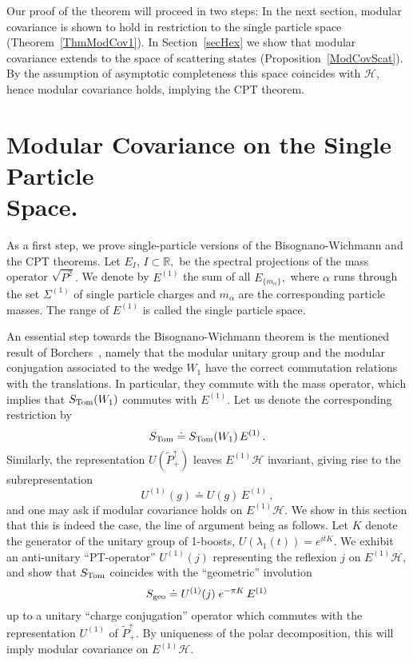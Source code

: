 \documentclass[a4paper,reqno,11pt]{amsart}
\theoremstyle{plain}
\theoremstyle{definition}
\numberwithin{equation}{section}
\newcommand{\Bb}{\mathbb{R}}
\newcommand{\calH}{{\mathcal H}}
\newcommand{\Potild}{\tilde{P}_+^{\uparrow}}
\newcommand{\He}{\calH^{(1)}}
\newcommand{\Sec}{\Sigma} %
\renewcommand{\sec}{\alpha}
\newcommand{\Sece}{\Sec^{(1)}} %
\newcommand{\Stom}{S_{\rm Tom}(W_1)}
\newcommand{\Stome}{S_{\rm Tom}} %
\newcommand{\Sgeoe}{S_{\rm geo}}  %
\newcommand{\msec}{{m_{\sec}}}
\newcommand{\Ue}{U^{(1)}}
\newcommand{\Uej}{U^{(1)}(j)}
\newcommand{\Ee}{E^{(1)}}
\newcommand{\Emsec}{E_{\{\msec\}}}
\begin{document}
Our proof of the theorem will proceed in two steps: In the next 
section, modular covariance is shown to hold in restriction to the
single particle space (Theorem~\ref{ThmModCov1}). 
In Section~\ref{secHex} we show that modular covariance extends to 
the space of scattering states (Proposition~\ref{ModCovScat}). 
By the assumption of asymptotic
completeness this space coincides with $\calH,$ hence modular covariance
holds, implying the CPT theorem. 
\section{Modular Covariance on the Single Particle \\ Space.}  \label{secH1} 
As a first step, we prove single-particle versions of the 
Bisognano-Wichmann and the CPT theorems.  Let $E_I$, $I\subset\Bb,$ be
the spectral projections of the mass 
operator $\sqrt{P^2}.$ We denote by $\Ee$ the sum of all $\Emsec,$ where 
$\sec$ runs through the set $\Sece$ of single particle charges   and 
$m_\sec$ are the corresponding particle masses. The range of $\Ee$ is
called the  single particle space. %

An essential step towards the Bisognano-Wichmann theorem is the 
mentioned result of
Borchers~\cite{Borch92,Borch93}, namely that the modular unitary group  
and the modular conjugation 
associated to the wedge $W_1$ have the correct commutation relations
with the translations. In particular, they commute with the mass
operator, which implies that $\Stom$ commutes with $\Ee.$ Let us denote the 
corresponding restriction by 
\begin{equation*} %
 \Stome\doteq \Stom\,\Ee \,. 
\end{equation*} 
Similarly, the representation $U(\Potild)$  leaves $\Ee\calH$ invariant,
giving rise to the subrepresentation 
\begin{equation*} %
  \Ue(g)\doteq U(g)\,\Ee\,, %
\end{equation*}    %
and one may ask if modular covariance holds on $\Ee\calH.$ We
show in this section that this is indeed the case, the line of
argument being as follows. Let $K$ denote the generator of the unitary
group of 1-boosts, $U(\lambda_1(t))=e^{itK}.$ We exhibit an anti-unitary 
``PT-operator'' $\Uej$ representing the reflexion $j$ on $\Ee\calH,$ and 
show that  $\Stome$ coincides with the ``geometric'' involution 
\begin{equation} \label{eqSgeo}
\Sgeoe\doteq \Uej\;e^{-\pi K}\,\Ee\, 
\end{equation} 
up to a unitary ``charge conjugation'' operator which commutes
with the representation $\Ue$ of $\Potild.$ 
By uniqueness of the polar decomposition, this will imply modular
covariance on $\Ee\calH.$ %
\end{document}
